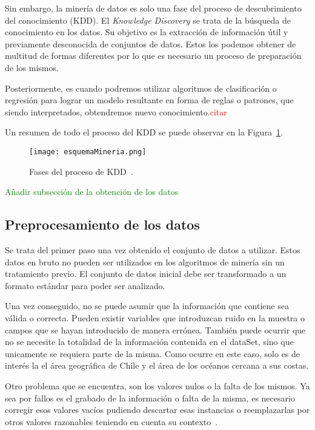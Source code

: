 Sin embargo, la minería de datos es solo una fase del proceso de descubrimiento del conocimiento (KDD). El \emph{Knowledge Discovery} se trata de la búsqueda de conocimiento en los datos. Su objetivo es la extracción de información útil y previamente desconocida de conjuntos de datos. Estos los podemos obtener de multitud de formas diferentes por lo que es necesario un proceso de preparación de los mismos.

Posteriormente, es cuando podremos utilizar algoritmos de clasificación o regresión para lograr un modelo resultante en forma de reglas o patrones, que siendo interpretados, obtendremos nuevo conocimiento.\textcolor{red}{citar}

Un resumen de todo el proceso del KDD se puede observar en la Figura~\ref{fasesKDD}.

\begin{figure}%
	\centering
	\texttt{[image: esquemaMineria.png]}
	\caption[Fases del proceso de KDD]{Fases del proceso de KDD~\cite{mineria_tecnicas_herramientas}.}
	\label{fasesKDD}
\end{figure}

\textcolor{green}{Añadir subsección de la obtención de los datos}
\subsection{Preprocesamiento de los datos}
Se trata del primer paso una vez obtenido el conjunto de datos a utilizar. Estos datos en bruto no pueden ser utilizados en los algoritmos de minería sin un tratamiento previo. El conjunto de datos inicial debe ser transformado a un formato estándar para poder ser analizado.

Una vez conseguido, no se puede asumir que la información que contiene sea válida o correcta. Pueden existir variables que introduzcan ruido en la muestra o campos que se hayan introducido de manera errónea. También puede ocurrir que no se necesite la totalidad de la información contenida en el dataSet, sino que unicamente se requiera parte de la misma. Como ocurre en este caso, solo es de interés la el área geográfica de Chile y el área de los océanos cercana a sus costas.

Otro problema que se encuentra, son los valores nulos o la falta de los mismos. Ya sea por fallos es el grabado de la información o falta de la misma, es necesario corregir esos valores vacíos pudiendo descartar esas instancias o reemplazarlas por otros valores razonables teniendo en cuenta su contexto~\cite{libro_mineria}.

